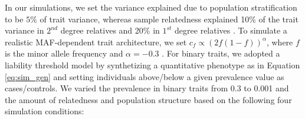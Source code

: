 In our simulations, we set the variance explained due to population stratification to be $5\%$ of trait variance, whereas sample relatedness explained 10\% of the trait variance in $2^{nd}$ degree relatives and 20\% in $1^{st}$ degree relatives \cite{jiang2019resource}.
%
To simulate a realistic MAF-dependent trait architecture, we set $c_f \propto (2f(1-f))^{\alpha}$, where $f$ is the minor allele frequency and $\alpha = -0.3$ \cite{zeng2018signatures,schoech2019quantification}.
%
For binary traits, we adopted a liability threshold model by synthetizing a quantitative phenotype as in Equation \ref{eq:sim_gen} and setting individuals above/below a given prevalence value as cases/controls.
%
We varied the prevalence in binary traits from 0.3 to 0.001 and the amount of relatedness and population structure based on the following four simulation conditions:
